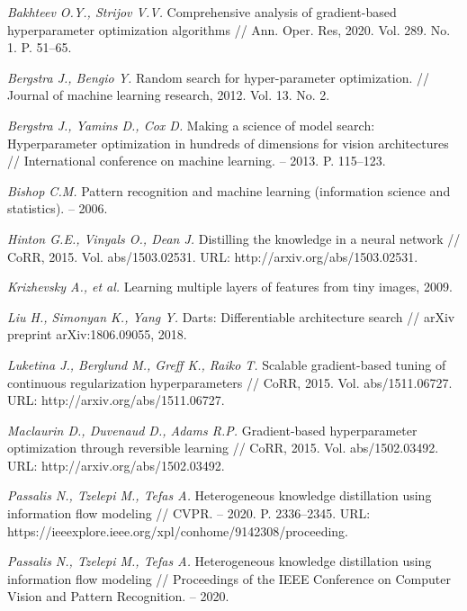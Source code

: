 \documentclass[12pt]{a&t}
\begin{document}
\begin{thebibliography}{10}

{\it Bakhteev O.Y., Strijov V.V.}
Comprehensive analysis of gradient-based hyperparameter optimization algorithms // Ann. Oper. Res, 2020. Vol. 289. No. 1. P. 51--65.

{\it Bergstra J., Bengio Y.}
Random search for hyper-parameter optimization. // Journal of machine learning research, 2012. Vol. 13. No. 2.

{\it Bergstra J., Yamins D., Cox D.}
Making a science of model search:  Hyperparameter optimization in hundreds of dimensions for vision architectures // International conference on machine learning. -- 2013. P. 115--123.

{\it Bishop C.M.}
Pattern recognition and machine learning (information science and statistics). -- 2006.

{\it Hinton G.E., Vinyals O., Dean J.}
Distilling the knowledge in a neural network // CoRR, 2015. Vol. abs/1503.02531. URL: http://arxiv.org/abs/1503.02531.

{\it Krizhevsky A., et al.}
Learning multiple layers of features from tiny images, 2009.

{\it Liu H., Simonyan K., Yang Y.}
Darts:  Differentiable architecture search // arXiv preprint arXiv:1806.09055, 2018.

{\it Luketina J., Berglund M., Greff K., Raiko T.}
Scalable gradient-based tuning of continuous regularization hyperparameters // CoRR, 2015. Vol. abs/1511.06727. URL: http://arxiv.org/abs/1511.06727.

{\it Maclaurin D., Duvenaud D., Adams R.P.}
Gradient-based hyperparameter optimization through reversible learning // CoRR, 2015. Vol. abs/1502.03492. URL: http://arxiv.org/abs/1502.03492.

{\it Passalis N., Tzelepi M., Tefas A.}
Heterogeneous knowledge distillation using information flow modeling // CVPR. -- 2020.  P. 2336--2345. URL: https://ieeexplore.ieee.org/xpl/conhome/9142308/proceeding.

{\it Passalis N., Tzelepi M., Tefas A.}
Heterogeneous knowledge distillation using information flow modeling // Proceedings of the IEEE Conference on Computer Vision and Pattern Recognition. -- 2020.


\end{thebibliography}
\end{document}
